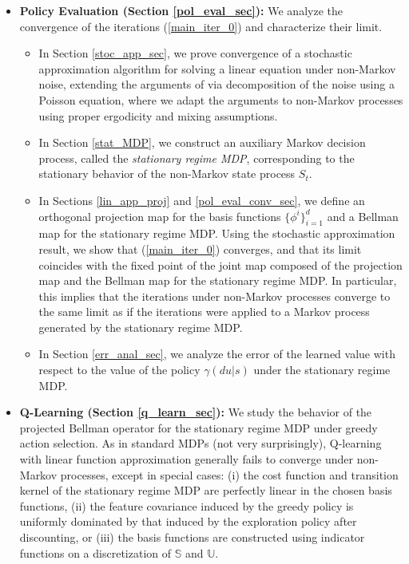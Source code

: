 \documentclass[11pt]{article}
\begin{document}
\begin{itemize}
\item \textbf{Policy Evaluation (Section \ref{pol_eval_sec}):} We analyze the convergence of the iterations (\ref{main_iter_0}) and characterize their limit. 
\begin{itemize}
\item In Section \ref{stoc_app_sec}, we prove convergence of a stochastic approximation algorithm for solving a linear equation under non-Markov noise, extending the arguments of \cite{benveniste2012adaptive} via decomposition of the noise using a Poisson equation, where we adapt the arguments to non-Markov processes using proper ergodicity and mixing assumptions.
\item In Section \ref{stat_MDP}, we construct an auxiliary Markov decision process, called the \emph{stationary regime MDP}, corresponding to the stationary behavior of the non-Markov state process $S_t$.
\item In Sections \ref{lin_app_proj} and \ref{pol_eval_conv_sec}, we define an orthogonal projection map for the basis functions $\{\phi^i\}_{i=1}^d$ and a Bellman map for the stationary regime MDP. Using the stochastic approximation result, we show that (\ref{main_iter_0}) converges, and that its limit coincides with the fixed point  of the joint map composed of the projection map and the Bellman map for the stationary regime MDP. In particular, this implies that the iterations under non-Markov processes converge to the same limit as if the iterations were applied to a Markov process generated by the stationary regime MDP.
\item In Section \ref{err_anal_sec}, we analyze the error of the learned value with respect to the value of the policy $\gamma(du|s)$ under the stationary regime MDP.
\end{itemize} 

\item \textbf{Q-Learning (Section \ref{q_learn_sec}):} We study the behavior of the projected Bellman operator for the stationary regime MDP under greedy action selection. As in standard MDPs  (not very surprisingly), Q-learning with linear function approximation generally fails to converge under non-Markov processes, except in special cases: 
(i) the cost function and transition kernel of the stationary regime MDP are perfectly linear in the chosen basis functions, 
(ii)  the feature covariance induced by the greedy policy
is uniformly dominated by that induced by the exploration policy after discounting, or 
(iii) the basis functions are constructed using indicator functions on a discretization of $\mathds{S}$ and $\mathds{U}$.



\end{itemize}
\end{document}
